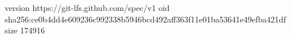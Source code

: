 version https://git-lfs.github.com/spec/v1
oid sha256:ce0b4dd4e609236c992338b5946bcd492aff363f11e01ba53641e49efba421df
size 174916
